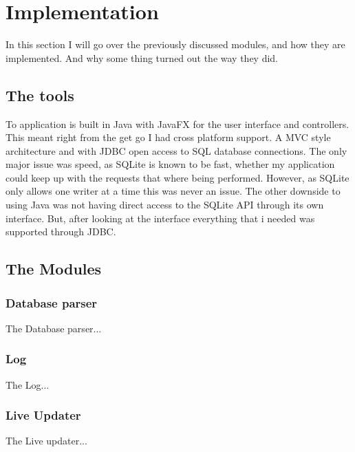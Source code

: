 \section{Implementation}
\label{sec:implementation}

In this section I will go over the previously discussed modules, and how they are implemented. And why some thing turned out the way they did.

\subsection{The tools}
\label{subsec:the_tools}

To application is built in Java with JavaFX for the user interface and controllers. This meant right from the get go I had cross platform support. A MVC style architecture and with JDBC open access to SQL database connections. The only major issue was speed, as SQLite is known to be fast, whether my application could keep up with the requests that where being performed. However, as SQLite only allows one writer at a time this was never an issue. The other downside to using Java was not having direct access to the SQLite API through its own interface. But, after looking at the interface everything that i needed was supported through JDBC.

\subsection{The Modules}
\label{subsec:the_modules}

\subsubsection{Database parser}
\label{subsubsec:database_parser}

The Database parser...

\subsubsection{Log}
\label{subsubsec:log}

The Log...

\subsubsection{Live Updater}
\label{subsubsec:Live Updater}

The Live updater...